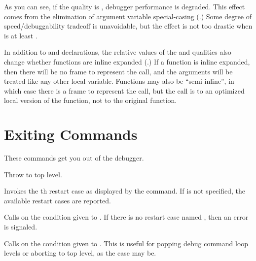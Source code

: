 As you can see, if the  quality is , debugger performance is
degraded.  This effect comes from the elimination of argument variable
special-casing (.)  Some degree of
speed/debuggability tradeoff is unavoidable, but the effect is not too drastic
when  is at least .

In addition to  and  declarations, the relative values
of the  and  qualities also change whether functions are
inline expanded (.)  If a function is inline
expanded, then there will be no frame to represent the call, and the arguments
will be treated like any other local variable.  Functions may also be
``semi-inline'', in which case there is a frame to represent the call, but the
call is to an optimized local version of the function, not to the original
function.


\section{Exiting Commands}

These commands get you out of the debugger.

\begin{Lentry}

\item[\code{quit}]
Throw to top level.

\item[\code{restart} \mopt{\var{n}}]%
Invokes the th restart case as displayed by the 
command.  If  is not specified, the available restart cases are
reported.

\item[\code{go}]
Calls  on the condition given to .  If there is no
restart case named , then an error is signaled.

\item[\code{abort}]
Calls  on the condition given to .  This is
useful for popping debug command loop levels or aborting to top level,
as the case may be.

% 
\end{Lentry}


